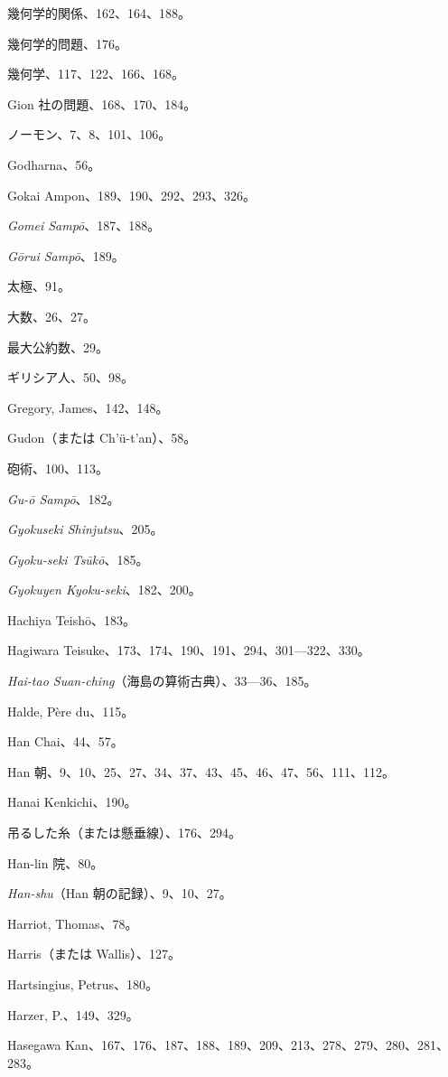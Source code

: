 \documentclass[11pt]{article}
\begin{document}
幾何学的関係、162、164、188。\par
幾何学的問題、176。\par
幾何学、117、122、166、168。\par
Gion 社の問題、168、170、184。\par
ノーモン、7、8、101、106。\par
Godharna、56。\par
Gokai Ampon、189、190、292、293、326。\par
\emph{Gomei Sampō}、187、188。\par
\emph{Gōrui Sampō}、189。\par
太極、91。\par
大数、26、27。\par
最大公約数、29。\par
ギリシア人、50、98。\par
Gregory, James、142、148。\par
Gudon（または Ch'ü-t'an）、58。\par
砲術、100、113。\par
\emph{Gu-ō Sampō}、182。\par
\emph{Gyokuseki Shinjutsu}、205。\par
\emph{Gyoku-seki Tsūkō}、185。\par
\emph{Gyokuyen Kyoku-seki}、182、200。\par
\medskip
Hachiya Teishō、183。\par
Hagiwara Teisuke、173、174、190、191、294、301---322、330。\par
\emph{Hai-tao Suan-ching}（海島の算術古典）、33---36、185。\par
Halde, Père du、115。\par
Han Chai、44、57。\par
Han 朝、9、10、25、27、34、37、43、45、46、47、56、111、112。\par
Hanai Kenkichi、190。\par
吊るした糸（または懸垂線）、176、294。\par
Han-lin 院、80。\par
\emph{Han-shu}（Han 朝の記録）、9、10、27。\par
Harriot, Thomas、78。\par
Harris（または Wallis）、127。\par
Hartsingius, Petrus、180。\par
Harzer, P.、149、329。\par
Hasegawa Kan、167、176、187、188、189、209、213、278、279、280、281、283。\par
\end{document}

